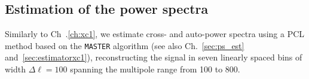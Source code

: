 \subsection{Estimation of the power spectra}
\label{subsec:methodology}
Similarly to Ch~.\eqref{ch:xc1}, we estimate cross- and auto-power spectra using a \gls{PCL} method based on the \texttt{MASTER}
algorithm \citep{Hivon2001a} (see also Ch.~\eqref{sec:ps_est} and~\eqref{sec:estimatorxc1}), reconstructing the signal in seven linearly spaced bins of
width $\Delta\ell = 100$ spanning the multipole range from 100 to 800.
 


